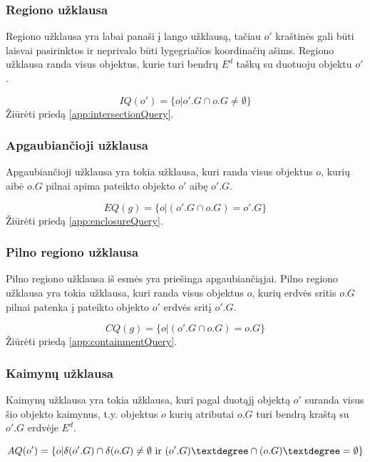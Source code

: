 \subsubsection{Regiono užklausa}
Regiono užklausa yra labai panaši į lango užklausą, tačiau $o'$ kraštinės gali būti laisvai pasirinktos ir neprivalo būti lygegriačios koordinačių ašims.
Regiono užklausa randa visus objektus, kurie turi bendrų $E^d$ taškų su duotuoju objektu $o'$.

\begin{equation}
	IQ(o') = \{ o | o'.G \cap o.G \neq \emptyset \}
\label{eq:ExactMatchQuery}
\end{equation}
Žiūrėti priedą \ref{app:intersectionQuery}.

\subsubsection{Apgaubiančioji užklausa}
Apgaubiančioji užklausa yra tokia užklausa, kuri randa visus objektus $o$, kurių aibė $o.G$ pilnai apima pateikto objekto $o'$ aibę $o'.G$.

\begin{equation}
	EQ(g) = \{ o | (o'.G \cap o.G) = o'.G \}
\label{eq:ExactMatchQuery}
\end{equation}
Žiūrėti priedą \ref{app:enclosureQuery}.


\subsubsection{Pilno regiono užklausa}
Pilno regiono užklausa iš esmės yra priešinga apgaubiančiąjai.
Pilno regiono užklausa yra tokia užklausa, kuri randa visus objektus $o$, kurių erdvės sritis $o.G$ pilnai patenka į pateikto objekto $o'$ erdvės sritį $o'.G$.

\begin{equation}
	CQ(g) = \{ o | (o'.G \cap o.G) = o.G \}
\label{eq:ExactMatchQuery}
\end{equation}
Žiūrėti priedą \ref{app:containmentQuery}.


\subsubsection{Kaimynų užklausa}
Kaimynų užklausa yra tokia užklausa, kuri pagal duotąjį objektą $o'$ suranda visus šio objekto kaimynus, t.y. objektus $o$ kurių atributai $o.G$ turi bendrą kraštą su $o'.G$ erdvėje $E^d$.

\begin{equation}
	AQ(o') = \{ o | \delta(o'.G) \cap \delta(o.G) \neq \emptyset \text{ ir } (o'.G)\textdegree \cap (o.G)\textdegree = \emptyset \}
\label{eq:ExactMatchQuery}
\end{equation}


